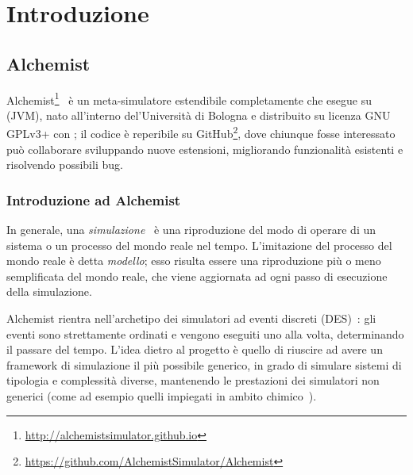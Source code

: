 

\chapter{Introduzione}\label{ch:intro}
    \section{Alchemist}\label{sec:alchemist}
        Alchemist\footnote{\url{http://alchemistsimulator.github.io}}~\cite{alchemist2013} è un meta-simulatore estendibile completamente  che esegue su  (JVM), nato all'interno del'Università di Bologna e distribuito su licenza GNU GPLv3+ con ; il codice è reperibile su GitHub\footnote{\url{https://github.com/AlchemistSimulator/Alchemist}}, dove chiunque fosse interessato può collaborare sviluppando nuove estensioni, migliorando funzionalità esistenti e risolvendo possibili bug.

        \subsection{Introduzione ad Alchemist}\label{sub:introAlchemist}
            In generale, una \emph{simulazione}~\cite{des3} è una riproduzione del modo di operare di un sistema o un processo del mondo reale nel tempo.
            L'imitazione del processo del mondo reale è detta \emph{modello}; esso risulta essere una riproduzione più o meno semplificata del mondo reale, che viene aggiornata ad ogni passo di esecuzione della simulazione.

            Alchemist rientra nell'archetipo dei simulatori ad eventi discreti (DES)~\cite{des, des2}: gli eventi sono strettamente ordinati e vengono eseguiti uno alla volta, determinando il passare del tempo.
            L'idea dietro al progetto è quello di riuscire ad avere un framework di simulazione il più possibile generico, in grado di simulare sistemi di tipologia e complessità diverse, mantenendo le prestazioni dei simulatori non generici (come ad esempio quelli impiegati in ambito chimico~\cite{gillespie1976}).

